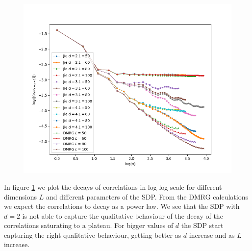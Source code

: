 \documentclass[10pt,a4paper,twoside,twocolumn]{revtex4-1}
\begin{document}
\begin{figure}[H]
  \centerline{
\includegraphics[width=1.\linewidth]{Figures/B1/Correlations_log-log-d4.png}}
  \label{Fig:Power-Law-Correlations-B1}
\end{figure}
In figure \ref{Fig:Power-Law-Correlations-B1} we plot the decays of correlations in log-log scale for different dimensions $L$ and different parameters of the SDP. From the DMRG calculations we expect the correlations to decay as a power law. We see that the SDP with $d=2$ is not able to capture the qualitative behaviour of the decay of the correlations saturating to a plateau. For bigger values of $d$ the SDP start capturing the right qualitative behaviour, getting better as $d$ increase and as $L$ increase.
\end{document}
